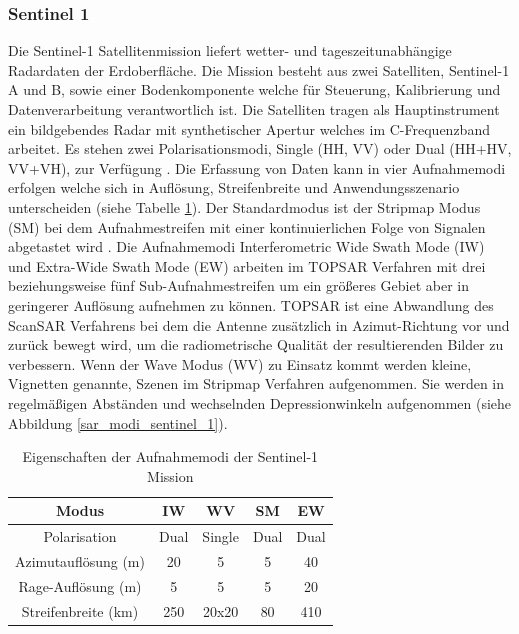 \subsubsection{Sentinel 1}
Die Sentinel-1 Satellitenmission liefert wetter- und tageszeitunabhängige Radardaten der Erdoberfläche. Die Mission besteht aus zwei Satelliten, Sentinel-1 A und B,
sowie einer Bodenkomponente welche für Steuerung, Kalibrierung und Datenverarbeitung verantwortlich ist. Die Satelliten tragen als Hauptinstrument ein 
bildgebendes Radar mit synthetischer Apertur welches im C-Frequenzband arbeitet. Es stehen zwei Polarisationsmodi, Single (HH, VV) oder Dual (HH+HV, VV+VH),
zur Verfügung \cite{sentinel_1_definition}. 
Die Erfassung von Daten kann in vier Aufnahmemodi erfolgen welche sich in Auflösung, Streifenbreite und Anwendungsszenario unterscheiden (siehe Tabelle \ref{aufnahmemodi_sentinel_1}). 
Der Standardmodus ist der Stripmap Modus (SM) bei dem Aufnahmestreifen mit einer kontinuierlichen Folge von Signalen abgetastet wird \cite{sentinel_1_definition}.
Die Aufnahmemodi Interferometric Wide Swath Mode (IW) und Extra-Wide Swath Mode (EW) arbeiten im TOPSAR Verfahren mit drei beziehungsweise
fünf Sub-Aufnahmestreifen um ein größeres Gebiet aber in geringerer Auflösung aufnehmen zu können. TOPSAR ist eine Abwandlung des ScanSAR Verfahrens bei 
dem die Antenne zusätzlich in Azimut-Richtung vor und zurück bewegt wird, um die radiometrische Qualität der resultierenden Bilder zu verbessern. 
Wenn der Wave Modus (WV) zu Einsatz kommt werden kleine, Vignetten genannte, Szenen im Stripmap Verfahren aufgenommen. Sie werden in regelmäßigen Abständen und
wechselnden Depressionwinkeln aufgenommen (siehe Abbildung \ref{sar_modi_sentinel_1})\cite{tutorial_on_sar}\cite{sentinel_1_definition}.   


\begin{center}
\begin{table}[H]
    \caption{Eigenschaften der Aufnahmemodi der Sentinel-1 Mission \cite{sentinel_1_overview}}
    \centering
    \begin{tabular}{c|c c c c } 
        Modus & IW & WV & SM & EW \\ 
        \hline
        Polarisation & Dual & Single & Dual & Dual \\ 
        Azimutauflösung (m) & 20 & 5 & 5 & 40 \\
        Rage-Auflösung (m) & 5 & 5 & 5 & 20 \\
        Streifenbreite (km) & 250 & 20x20 & 80 & 410\\
    \end{tabular}
    \label{aufnahmemodi_sentinel_1}
\end{table}
\end{center}

